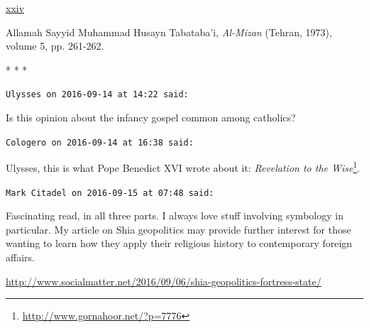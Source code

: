 \hyperref[_ednref24]{ xxiv }

Allamah Sayyid Muhammad Husayn Tabataba'i, \emph{Al-Mizan} (Tehran, 1973), volume 5, pp. 261-262.



\begin{center}* * *\end{center}

\begin{footnotesize}
\begin{sffamily}
\texttt{Ulysses on 2016-09-14 at 14:22 said:}

Is this opinion about the infancy gospel common among catholics?

\hfill

\texttt{Cologero on 2016-09-14 at 16:38 said:}

Ulysses, this is what Pope Benedict XVI wrote about it:
\textit{Revelation to the Wise}\footnote{\url{http://www.gornahoor.net/?p=7776}}.


\hfill

\texttt{Mark Citadel on 2016-09-15 at 07:48 said:}

Fascinating read, in all three parts. I always love stuff involving symbology in particular. My article on Shia geopolitics may provide further interest for those wanting to learn how they apply their religious history to contemporary foreign affairs.

\url{http://www.socialmatter.net/2016/09/06/shia-geopolitics-fortress-state/}



\hfill

\end{sffamily}
\end{footnotesize}

